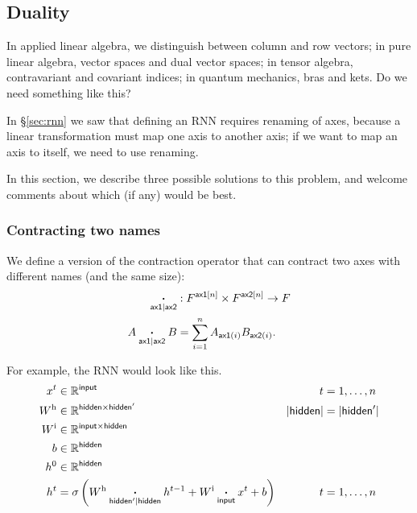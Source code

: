 \subsection{Duality}
\label{sec:duality}

In applied linear algebra, we distinguish between column and row vectors; in pure linear algebra, vector spaces and dual vector spaces; in tensor algebra, contravariant and covariant indices; in quantum mechanics, bras and kets. Do we need something like this?

In \S\ref{sec:rnn} we saw that defining an RNN requires renaming of axes, because a linear transformation must map one axis to another axis; if we want to map an axis to itself, we need to use renaming.

In this section, we describe three possible solutions to this problem, and welcome comments about which (if any) would be best.

\subsubsection{Contracting two names}

We define a version of the contraction operator that can contract two axes with different names (and the same size):
\begin{align*}
\mathbin{\mathop{\boldsymbol\cdot}\limits_{\mathsf{ax1}\mid\mathsf{ax2}}} &: F^{\mathsf{ax1}[n]} \times F^{\mathsf{ax2}[n]} \rightarrow F \\
A \mathbin{\mathop{\boldsymbol\cdot}\limits_{\mathsf{ax1}\mid\mathsf{ax2}}} B &= \sum_{i=1}^n A_{\mathsf{ax1}(i)} B_{\mathsf{ax2}(i)}.
\end{align*}

For example, the RNN would look like this.
\begin{align*}
x^{t} &\in \mathbb{R}^{\mathsf{input}} & t &= 1, \ldots, n \\
W^{\text{h}} &\in \mathbb{R}^{\mathsf{hidden} \times \mathsf{hidden'}} & |\mathsf{hidden}| &= |\mathsf{hidden'}| \\
W^{\text{i}} &\in \mathbb{R}^{\mathsf{input} \times \mathsf{hidden}} \\
b &\in \mathbb{R}^{\mathsf{hidden}} \\
h^{0} &\in \mathbb{R}^{\mathsf{hidden}} \\
h^{t} &= \sigma\left( W^{\text{h}} \mathbin{\mathop{\boldsymbol\cdot}\limits_{\mathsf{hidden'}\mid\mathsf{hidden}}} h^{t-1} + W^{\text{i}} \mathbin{\mathop{\boldsymbol\cdot}\limits_{\mathsf{input}}} x^{t} + b \right) & t &= 1, \ldots, n
\end{align*}

